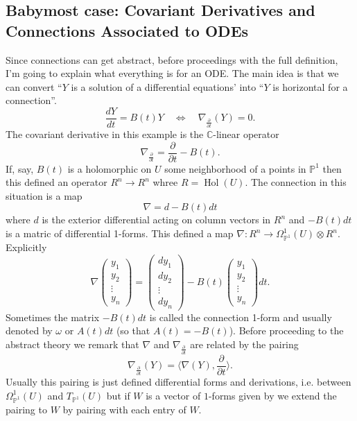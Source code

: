 \documentclass[12pt]{book}
\numberwithin{equation}{section}
\theoremstyle{definition}
\theoremstyle{remark}
\newcommand{\CC}{\mathbb{C}}
\newcommand{\PP}{\mathbb{P}}
\newcommand{\hol}{\operatorname{Hol}}
\begin{document}
\subsection{Babymost case: Covariant Derivatives and Connections Associated to ODEs}
Since connections can get abstract, before proceedings with the full definition, I'm going to explain what everything is for an ODE. 
The main idea is that we can convert ``$Y$ is a solution of a differential equations' into ``$Y$ is horizontal for a connection''.
$$
\dfrac{dY}{dt}=B(t)Y \quad \iff \quad \nabla_{\frac{\partial}{\partial t}}(Y) =0.
$$
The covariant derivative in this example is the $\CC$-linear operator 
$$ \nabla_{\frac{\partial}{\partial t}} = \dfrac{\partial}{\partial t} - B(t).$$
If, say, $B(t)$ is a holomorphic on $U$ some neighborhood of a points in $\PP^1$ then this defined an operator $R^n \to R^n$ whree $R=\hol(U)$.
The connection in this situation is a map
$$ \nabla = d-B(t)dt $$
where $d$ is the exterior differential acting on column vectors in $R^n$ and $-B(t)dt$ is a matric of differential 1-forms. 
This defined a map $\nabla: R^n \to \Omega^1_{\PP^1}(U) \otimes R^n$.
Explicitly 
$$ \nabla \begin{pmatrix}
y_1 \\
y_2\\
\vdots \\
y_n
\end{pmatrix} = \begin{pmatrix}
dy_1 \\
dy_2\\
\vdots \\
dy_n
\end{pmatrix} - B(t) \begin{pmatrix}
y_1 \\
y_2\\
\vdots \\
y_n
\end{pmatrix} dt. $$
Sometimes the matrix $-B(t)dt$ is called the connection 1-form and usually denoted by $\omega$ or $A(t)dt$ (so that $A(t)=-B(t)$). 
Before proceeding to the abstract theory we remark that $\nabla$ and $\nabla_{\frac{\partial}{\partial t}}$ are related by the pairing 
$$ \nabla_{\frac{\partial}{\partial t}}(Y) = \langle \nabla(Y), \dfrac{\partial}{\partial t} \rangle.$$
Usually this pairing is just defined differential forms and derivations, i.e. between $\Omega_{\PP^1}^1(U)$ and $T_{\PP^1}(U)$ but if $W$ is a vector of $1$-forms given by we extend the pairing to $W$ by pairing with each entry of $W$.
\end{document}
